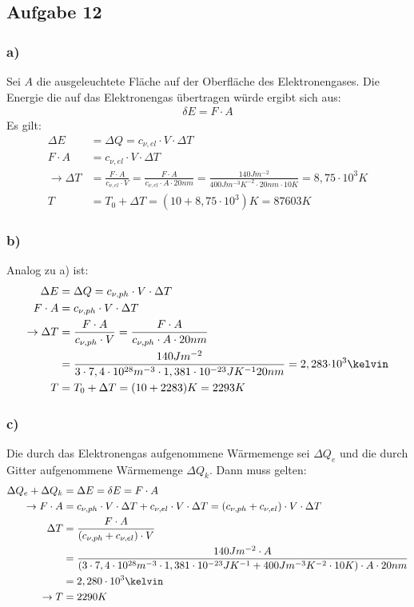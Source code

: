 \subsection*{Aufgabe 12}
\subsubsection*{a)}
Sei $A$ die ausgeleuchtete Fläche auf der Oberfläche des Elektronengases. Die Energie die auf das Elektronengas übertragen würde ergibt sich aus:
\begin{align*}
\delta E = F\cdot A
\end{align*}
Es gilt:
\begin{align*}
\Delta E &= \Delta Q= c_{\nu,el}\cdot V\cdot\Delta T\\
F\cdot A&= c_{\nu,el}\cdot V\cdot\Delta T\\
\rightarrow \Delta T &= \frac{F\cdot A}{c_{\nu,el}\cdot V} = \frac{F\cdot A}{c_{\nu,el}\cdot A\cdot \unit{20}{nm}} =  \frac{\unit{140}{Jm^{-2}}}{\unit{400}{Jm^{-3}K^{-2}}\cdot \unit{20}{nm}\cdot\unit{10}{K}} =8,75\cdot10^3K\\
T&=T_0+\Delta T = (10+8,75\cdot10^3)K = 87603K
\end{align*}

\subsubsection*{b)}
Analog zu a) ist:
\begin{align*}
\Delta E &= \Delta Q= c_{\nu,ph}\cdot V\cdot\Delta T\\
F\cdot A&= c_{\nu,ph}\cdot V\cdot\Delta T\\
\rightarrow \Delta T &= \frac{F\cdot A}{c_{\nu,ph}\cdot V} = \frac{F\cdot A}{c_{\nu,ph}\cdot A\cdot \unit{20}{nm}} \\
&=\frac{\unit{140}{Jm^{-2}}}{3 \cdot 7,4\cdot10^{28}\unit{}{m^{-3}}\cdot1,381\cdot10^{-23}\unit{}{JK^{-1}} \unit{20}{nm}}=
\unit{2,283}{\cdot 10^3}{\kelvin}\\
T&=T_0+\Delta T = (10+2283)K = 2293 K
\end{align*}
\subsubsection*{c)}
Die durch das Elektronengas aufgenommene Wärmemenge sei $\Delta Q_e$ und die durch Gitter aufgenommene Wärmemenge $\Delta Q_k$. Dann muss gelten:
\begin{align*}
\Delta Q_e+\Delta Q_k &= \Delta E = \delta E = F\cdot A\\
\rightarrow F\cdot A &=c_{\nu,ph}\cdot V\cdot\Delta T+c_{\nu,el}\cdot V\cdot\Delta T = (c_{\nu,ph}+c_{\nu,el})\cdot V\cdot\Delta T\\
\Delta T &= \frac{F\cdot A}{(c_{\nu,ph}+c_{\nu,el})\cdot V}\\
&= \frac{\unit{140}{Jm^{-2}}\cdot A}{(3 \cdot 7,4\cdot10^{28}\unit{}{m^{-3}}\cdot1,381\cdot10^{-23}\unit{}{JK^{-1}}+\unit{400}{Jm^{-3}K^{-2}}\cdot\unit{10}{K})\cdot A\cdot \unit{20}{nm}}\\
&= 2,280\cdot10^3\kelvin\\
\rightarrow T &= 2290 K
\end{align*}

